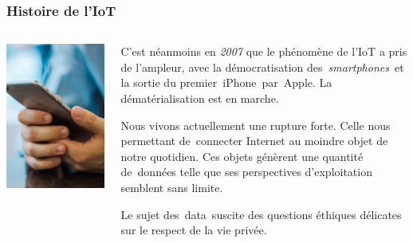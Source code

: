 \documentclass[aspectratio=169,utf8,french]{beamer}
\begin{document}
\begin{frame}
  \frametitle{Histoire de l'IoT}
  \begin{columns}
    \begin{column}{.3\textwidth}
      \includegraphics[width=\textwidth]{pictures/smartphone.jpg}
    \end{column}
    \begin{column}{.7\textwidth}
      C’est néanmoins en \emph{2007} que le phénomène de l'IoT a pris de l’ampleur, avec la démocratisation des \emph{smartphones} et la sortie du premier iPhone par Apple.
      La dématérialisation est en marche.

      Nous vivons actuellement une rupture forte.
      Celle nous permettant de connecter Internet au moindre objet de notre quotidien.
      Ces objets génèrent une quantité de données telle que ses perspectives d’exploitation semblent sans limite.

      Le sujet des data suscite des questions éthiques délicates sur le respect de la vie privée.
    \end{column}
  \end{columns}
\end{frame}
\end{document}
